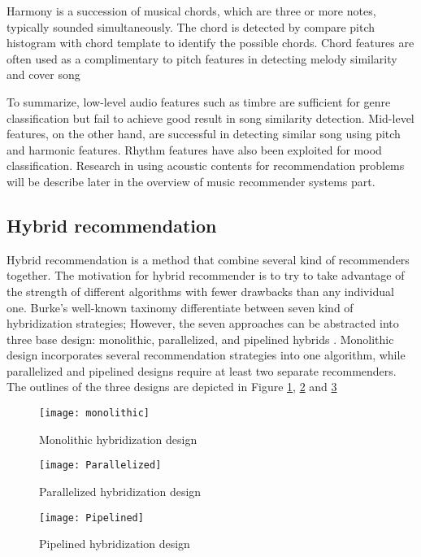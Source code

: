 Harmony is a succession of musical chords, which are three or more notes, typically sounded simultaneously. The chord is detected by compare pitch histogram with chord template to identify the possible chords. Chord features are often used as a complimentary to pitch features in detecting melody similarity and cover song \cite{ellis2007identifyingcover} \cite{bello2007audio}

To summarize, low-level audio features such as timbre are sufficient for genre classification but fail to achieve good result in song similarity detection. Mid-level features, on the other hand, are successful in detecting similar song using pitch and harmonic features. Rhythm features have also been exploited for mood classification. Research in using acoustic contents for recommendation problems will be describe later in the overview of music recommender systems part. 

\subsection{Hybrid recommendation}
Hybrid recommendation is a method that combine several kind of recommenders together. The motivation for hybrid recommender is to try to take advantage of the strength of different algorithms with fewer drawbacks than any individual one. Burke's well-known taxinomy \cite{burke2002hybrid} differentiate between seven kind of hybridization strategies; However, the seven approaches can be abstracted into three base design: monolithic, parallelized, and pipelined hybrids \cite{jannach2010recommender}. Monolithic design incorporates several recommendation strategies into one algorithm, while parallelized and pipelined designs require at least two separate recommenders. The outlines of the three designs are depicted in Figure \ref{fig:monolithic}, \ref{fig:parallelized} and \ref{fig:pipelined}

\begin{figure}[h]
\texttt{[image: monolithic]}
\centering
\caption{Monolithic hybridization design}
\label{fig:monolithic}

\end{figure}

\begin{figure}[h]
\texttt{[image: Parallelized]}
\centering
\caption{Parallelized hybridization design}
\label{fig:parallelized}
\end{figure}

\begin{figure}[h]
\texttt{[image: Pipelined]}
\centering
\caption{Pipelined hybridization design}
\label{fig:pipelined}
\end{figure}

